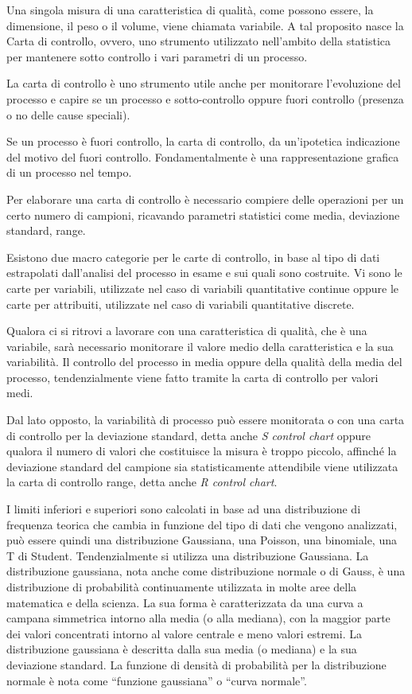 Una singola misura di una caratteristica di qualità, come possono essere, la dimensione, il peso o il volume, viene chiamata variabile.
A tal proposito nasce la Carta di controllo, ovvero, uno strumento utilizzato nell'ambito della statistica per mantenere sotto controllo i vari parametri di un processo. 
\cite{montgomery2009statistical}

La carta di controllo è uno strumento utile anche per monitorare l'evoluzione del processo e capire se un processo e sotto-controllo oppure fuori controllo (presenza o no delle cause speciali).

Se un processo è fuori controllo, la carta di controllo, da un'ipotetica indicazione del motivo del fuori controllo.
Fondamentalmente è una rappresentazione grafica di un processo nel tempo.

Per elaborare una carta di controllo è necessario compiere delle operazioni per un certo numero di campioni, ricavando parametri statistici come media, deviazione standard, range. 

Esistono due macro categorie per le carte di controllo, in base al tipo di dati estrapolati dall'analisi del processo in esame e sui quali sono costruite. 
Vi sono le carte per variabili, utilizzate nel caso di variabili quantitative continue oppure le carte per attribuiti, utilizzate nel caso di variabili quantitative discrete. 
\cite{DiNardo}


Qualora ci si ritrovi a lavorare con una caratteristica di qualità, che è una variabile, sarà necessario monitorare il valore medio della caratteristica e la sua variabilità.
Il controllo del processo in media oppure della qualità della media del processo, tendenzialmente viene fatto tramite la carta di controllo per valori medi. 


Dal lato opposto, la variabilità di processo può essere monitorata o con una carta di controllo per la deviazione standard, detta anche \textit{S control chart} oppure qualora il numero di valori che costituisce la misura è troppo piccolo, affinché la deviazione standard del campione sia statisticamente attendibile viene utilizzata la carta di controllo range, detta anche \textit{R control chart}.
\cite{montgomery2009statistical}


I limiti inferiori e superiori sono calcolati in base ad una distribuzione di frequenza teorica che cambia in funzione del tipo di dati che vengono analizzati, può essere quindi una distribuzione Gaussiana, una Poisson, una binomiale, una T di Student.
Tendenzialmente si utilizza una distribuzione Gaussiana. 
La distribuzione gaussiana, nota anche come distribuzione normale o di Gauss, è una distribuzione di probabilità continuamente utilizzata in molte aree della matematica e della scienza. La sua forma è caratterizzata da una curva a campana simmetrica intorno alla media (o alla mediana), con la maggior parte dei valori concentrati intorno al valore centrale e meno valori estremi. La distribuzione gaussiana è descritta dalla sua media (o mediana) e la sua deviazione standard. La funzione di densità di probabilità per la distribuzione normale è nota come ``funzione gaussiana'' o ``curva normale''.
\cite{WikipediaGauss}



